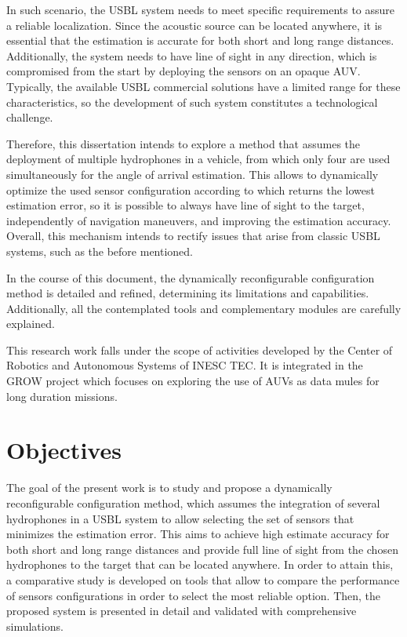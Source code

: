 In such scenario, the USBL system needs to meet specific requirements to assure a reliable localization. Since the acoustic source can be located anywhere, it is essential that the estimation is accurate for both short and long range distances. Additionally, the system needs to have line of sight in any direction, which is compromised from the start by deploying the sensors on an opaque AUV. Typically, the available USBL commercial solutions have a limited range for these characteristics, so the development of such system constitutes a technological challenge.

Therefore, this dissertation intends to explore a method that assumes the deployment of multiple hydrophones in a vehicle, from which only four are used simultaneously for the angle of arrival estimation. This allows to dynamically optimize the used sensor configuration according to which returns the lowest estimation error, so it is possible to always have line of sight to the target, independently of navigation maneuvers, and improving the estimation accuracy. Overall, this mechanism intends to rectify issues that arise from classic USBL systems, such as the before mentioned. 

In the course of this document, the dynamically reconfigurable configuration method is detailed and refined, determining its limitations and capabilities. Additionally, all the contemplated tools and complementary modules are carefully explained.

This research work falls under the scope of activities developed by the Center of Robotics and Autonomous Systems of INESC TEC. It is integrated in the GROW project which focuses on exploring the use of AUVs as data mules for long duration missions.


\section{Objectives} \label{sec:objective}

The goal of the present work is to study and propose a dynamically reconfigurable configuration method, which assumes the integration of several hydrophones in a USBL system to allow selecting the set of sensors that minimizes the estimation error. This aims to achieve high estimate accuracy for both short and long range distances and provide full line of sight from the chosen hydrophones to the target that can be located anywhere. In order to attain this, a comparative study is developed on tools that allow to compare the performance of sensors configurations in order to select the most reliable option. Then, the proposed system is presented in detail and validated with comprehensive simulations.

